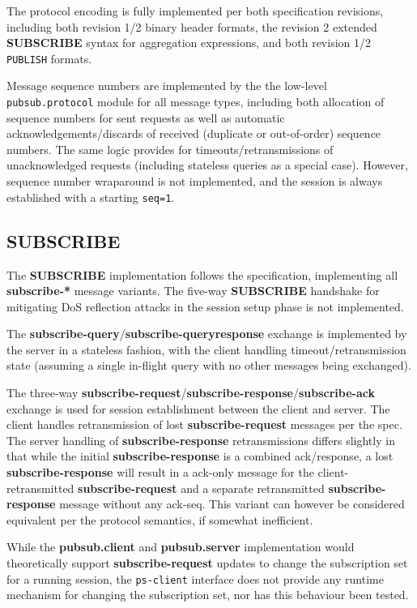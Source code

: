 \documentclass[a4paper]{article}
\begin{document}
The protocol encoding is fully implemented per both specification revisions, including both revision 1/2 binary header formats, the revision 2 extended \textbf{SUBSCRIBE} syntax for aggregation expressions, and both revision 1/2 \texttt{PUBLISH} formats.

Message sequence numbers are implemented by the the low-level \texttt{pubsub.protocol} module for all message types, including both allocation of sequence numbers for sent requests as well as automatic acknowledgements/discards of received (duplicate or out-of-order) sequence numbers.
The same logic provides for timeouts/retransmissions of unacknowledged requests (including stateless queries as a special case).
However, sequence number wraparound is not implemented, and the session is always established with a starting \texttt{seq=1}.

\subsection{\textbf{SUBSCRIBE}}
The \textbf{SUBSCRIBE} implementation follows the specification, implementing all \textbf{subscribe-*} message variants.
The five-way \textbf{SUBSCRIBE} handshake for mitigating DoS reflection attacks in the session setup phase is not implemented.

The \textbf{subscribe-query}/\textbf{subscribe-queryresponse} exchange is implemented by the server in a stateless fashion, with the client handling timeout/retransmission state (assuming a single in-flight query with no other messages being exchanged).

The three-way \textbf{subscribe-request}/\textbf{subscribe-response}/\textbf{subscribe-ack} exchange is used for session establishment between the client and server.
The client handles retransmission of lost \textbf{subscribe-request} messages per the spec.
The server handling of \textbf{subscribe-response} retransmissions differs slightly in that while the initial \textbf{subscribe-response} is a combined ack/response, a lost \textbf{subscribe-response} will result in a ack-only message for the client-retransmitted \textbf{subscribe-request} and a separate retransmitted \textbf{subscribe-response} message without any ack-seq.
This variant can however be considered equivalent per the protocol semantics, if somewhat inefficient.

While the \textbf{pubsub.client} and \textbf{pubsub.server} implementation would theoretically support \textbf{subscribe-request} updates to change the subscription set for a running session, the \texttt{ps-client} interface does not provide any runtime mechanism for changing the subscription set, nor has this behaviour been tested.
\end{document}
